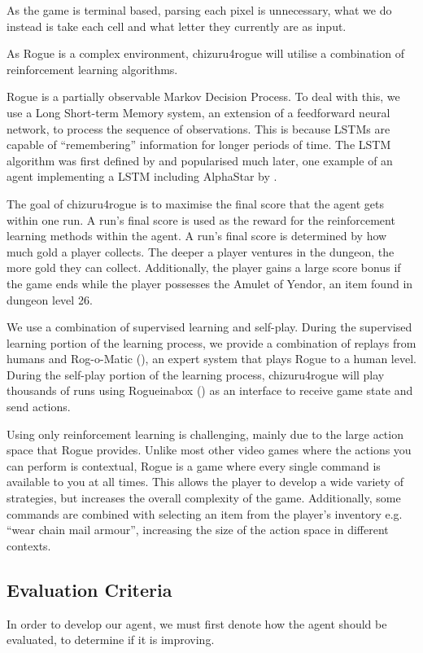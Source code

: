 \documentclass[11pt,a4paper]{article}
\begin{document}
As the game is terminal based, parsing each pixel is unnecessary, what we do instead is take each cell and what letter they currently are as input.

As Rogue is a complex environment, chizuru4rogue will utilise a combination of reinforcement learning algorithms.

Rogue is a partially observable Markov Decision Process. To deal with this, we use a Long Short-term Memory system, an extension of a feedforward neural network, to process the sequence of observations. This is because LSTMs are capable of ``remembering'' information for longer periods of time. The LSTM algorithm was first defined by \cite{hochreiter97} and popularised much later, one example of an agent implementing a LSTM including AlphaStar by \cite{vinyals19}.

The goal of chizuru4rogue is to maximise the final score that the agent gets within one run. A run's final score is used as the reward for the reinforcement learning methods within the agent. A run's final score is determined by how much gold a player collects. The deeper a player ventures in the dungeon, the more gold they can collect. Additionally, the player gains a large score bonus if the game ends while the player possesses the Amulet of Yendor, an item found in dungeon level 26.

We use a combination of supervised learning and self-play. During the supervised learning portion of the learning process, we provide a combination of replays from humans and Rog-o-Matic (\cite{mauldin83}), an expert system that plays Rogue to a human level. During the self-play portion of the learning process, chizuru4rogue will play thousands of runs using Rogueinabox (\cite{asperti17}) as an interface to receive game state and send actions.

Using only reinforcement learning is challenging, mainly due to the large action space that Rogue provides. Unlike most other video games where the actions you can perform is contextual, Rogue is a game where every single command is available to you at all times. This allows the player to develop a wide variety of strategies, but increases the overall complexity of the game. Additionally, some commands are combined with selecting an item from the player's inventory e.g. ``wear chain mail armour'', increasing the size of the action space in different contexts.

\subsection{Evaluation Criteria}
In order to develop our agent, we must first denote how the agent should be evaluated, to determine if it is improving.
\end{document}
